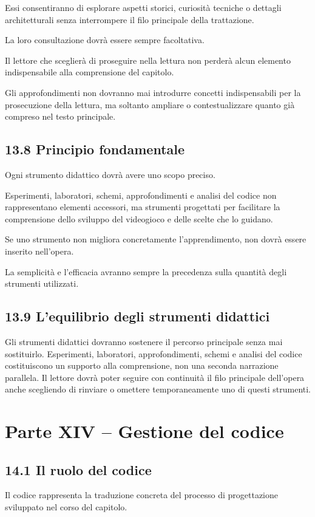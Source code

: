 \documentclass{article}
\begin{document}
Essi consentiranno di esplorare aspetti storici, curiosità tecniche o dettagli architetturali senza interrompere il filo
principale della trattazione.

La loro consultazione dovrà essere sempre facoltativa.

Il lettore che sceglierà di proseguire nella lettura non perderà alcun elemento indispensabile alla comprensione del
capitolo.

Gli approfondimenti non dovranno mai introdurre concetti indispensabili per la prosecuzione della lettura, ma soltanto
ampliare o contestualizzare quanto già compreso nel testo principale.

\subsection{13.8 Principio fondamentale}
Ogni strumento didattico dovrà avere uno scopo preciso.

Esperimenti, laboratori, schemi, approfondimenti e analisi del codice non rappresentano elementi accessori, ma strumenti
progettati per facilitare la comprensione dello sviluppo del videogioco e delle scelte che lo guidano.

Se uno strumento non migliora concretamente l'apprendimento, non dovrà essere inserito nell'opera.

La semplicità e l'efficacia avranno sempre la precedenza sulla quantità degli strumenti utilizzati.

\subsection[13.9 L{}'equilibrio degli strumenti didattici]{13.9 L'equilibrio degli strumenti didattici}
Gli strumenti didattici dovranno sostenere il percorso principale senza mai sostituirlo. Esperimenti, laboratori,
approfondimenti, schemi e analisi del codice costituiscono un supporto alla comprensione, non una seconda narrazione
parallela. Il lettore dovrà poter seguire con continuità il filo principale dell'opera anche scegliendo di rinviare o
omettere temporaneamente uno di questi strumenti.

\section{Parte XIV – Gestione del codice}
\subsection{14.1 Il ruolo del codice}
Il codice rappresenta la traduzione concreta del processo di progettazione sviluppato nel corso del capitolo.
\end{document}
